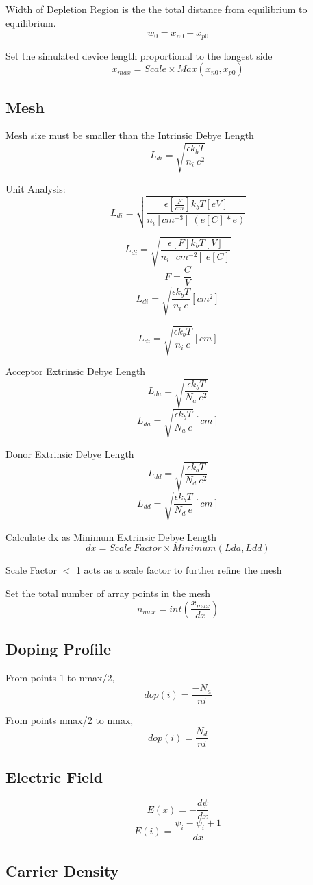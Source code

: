 \documentclass[12pt]{article}
\begin{document}
Width of Depletion Region is the the total distance from equilibrium to equilibrium.
\[
w_{0}=x_{n0}+x_{p0}
\]

Set the simulated device length proportional to the longest side
\[
x_{max}= Scale \times Max(x_{n0},x_{p0})
\]

\subsection{Mesh \cite[p. 36]{Vasileska2006}}
Mesh size must be smaller than the Intrinsic Debye Length \cite[eq. 3.12]{Vasileska2006}
\[
L_{di}=\sqrt{\frac{\epsilon k_{b} T}{n_{i} \ e^{2}}}
\]

Unit Analysis:
\[
L_{di}=\sqrt{\frac{\epsilon [\frac{F}{cm}] k_{b} T [eV]}{n_{i} [cm^{-3}] \ (e [C] * e ) }}
\]

\[
L_{di}=\sqrt{\frac{\epsilon [F] k_{b} T [V]}{n_{i} [cm^{-2}] \ e [C] }}
\]
\[
F=\frac{C}{V}
\]
\[
L_{di}=\sqrt{\frac{\epsilon k_{b} T}{n_{i}  \ e}[cm^{2}]}
\]

\[
L_{di}=\sqrt{\frac{\epsilon k_{b} T}{n_{i}  \ e}}[cm]
\]

Acceptor Extrinsic Debye Length 
\[
L_{da}=\sqrt{\frac{\epsilon k_{b} T}{N_{a} \ e^{2}}}
\]
\[
L_{da}=\sqrt{\frac{\epsilon k_{b} T}{N_{a} \ e}}[cm]
\]

Donor Extrinsic Debye Length 
\[
L_{dd}=\sqrt{\frac{\epsilon k_{b} T}{N_{d} \ e^{2}}}
\]
\[
L_{dd}=\sqrt{\frac{\epsilon k_{b} T}{N_{d} \ e}}[cm]
\]

Calculate dx as Minimum Extrinsic Debye Length
\[
dx= Scale \ Factor \times Minimum(Lda, Ldd)
\]

Scale Factor $<$ 1 acts as a scale factor to further refine the mesh

Set the total number of array points in the mesh
\[
n_{max}=int(\frac{x_{max}}{dx})
\]

\subsection{Doping Profile}
From points 1 to nmax/2,
\[
dop(i)=\frac{-N_{a}}{ni}
\]

From points nmax/2 to nmax,
\[
dop(i)=\frac{N_{d}}{ni}
\]

\subsection{Electric Field}
\[
E(x)=-\frac{d \psi}{dx}
\]
\[
E(i)=\frac{\psi_{i}-\psi_{i}+1}{dx}
\]

\subsection{Carrier Density}
\end{document}
